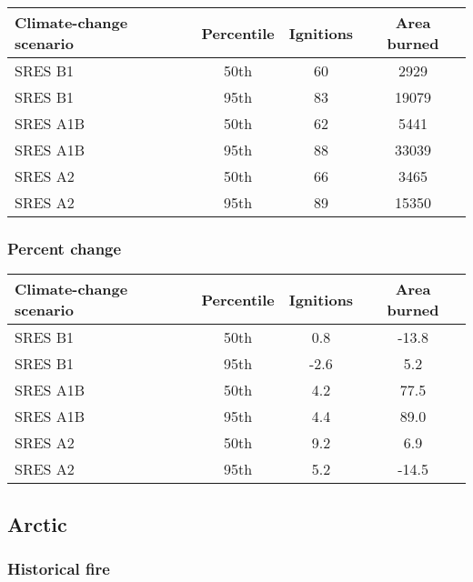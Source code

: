 \documentclass{article}\usepackage[]{graphicx}\usepackage[]{color}
\newcommand{\headcol}{\rowcolor{tableheadcolor}}
\begin{document}
\begin{table}[ht]
\centering
\begin{tabular}{lccc}
  \headcol 
 \toprule
Climate-change scenario & Percentile & Ignitions & Area burned \\ 
  \midrule
SRES B1 & 50th & 60 & 2929 \\ 
  SRES B1 & 95th & 83 & 19079 \\ 
  SRES A1B & 50th & 62 & 5441 \\ 
  SRES A1B & 95th & 88 & 33039 \\ 
  SRES A2 & 50th & 66 & 3465 \\ 
  SRES A2 & 95th & 89 & 15350 \\ 
   \bottomrule
\end{tabular}
\end{table}


\subsubsection{Percent change}

\begin{table}[ht]
\centering
\begin{tabular}{lccc}
  \headcol 
 \toprule
Climate-change scenario & Percentile & Ignitions & Area burned \\ 
  \midrule
SRES B1 & 50th & 0.8 & -13.8 \\ 
  SRES B1 & 95th & -2.6 & 5.2 \\ 
  SRES A1B & 50th & 4.2 & 77.5 \\ 
  SRES A1B & 95th & 4.4 & 89.0 \\ 
  SRES A2 & 50th & 9.2 & 6.9 \\ 
  SRES A2 & 95th & 5.2 & -14.5 \\ 
   \bottomrule
\end{tabular}
\end{table}


\newpage
\subsection{Arctic}
\subsubsection{Historical fire}
\end{document}
